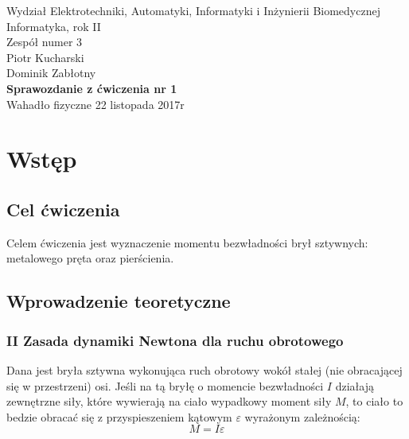 \documentclass[a4paper,12pts]{article}
\begin{document}
	\thispagestyle{empty}
	\begin{flushleft}
		Wydział Elektrotechniki, Automatyki, Informatyki i Inżynierii Biomedycznej \\
		Informatyka, rok II \\
		Zespół numer 3 \\
		Piotr Kucharski \\
		Dominik Zabłotny \\
		\vspace*{\fill}
		{\large \textbf{Sprawozdanie z ćwiczenia nr 1} } \\
		Wahadło fizyczne		
		\vfill	
		22 listopada 2017r
	\end{flushleft}
	
	\newpage
	
	
	\section{Wstęp}
	\subsection{Cel ćwiczenia}
	Celem ćwiczenia jest wyznaczenie momentu bezwładności brył sztywnych: metalowego pręta oraz pierścienia.
	
	\subsection{Wprowadzenie teoretyczne}
	\subsubsection{II Zasada dynamiki Newtona dla ruchu obrotowego}
	Dana jest bryła sztywna wykonująca ruch obrotowy wokół stałej (nie obracającej się w przestrzeni) osi. Jeśli na tą bryłę o momencie bezwładności $I$ działają zewnętrzne siły, które wywierają na ciało wypadkowy moment siły $M$, to ciało to bedzie obracać się z przyspieszeniem kątowym $\varepsilon$ wyrażonym zależnością:
	\begin{equation}
		M = I \varepsilon
	\end{equation} 
	
	
\end{document}
